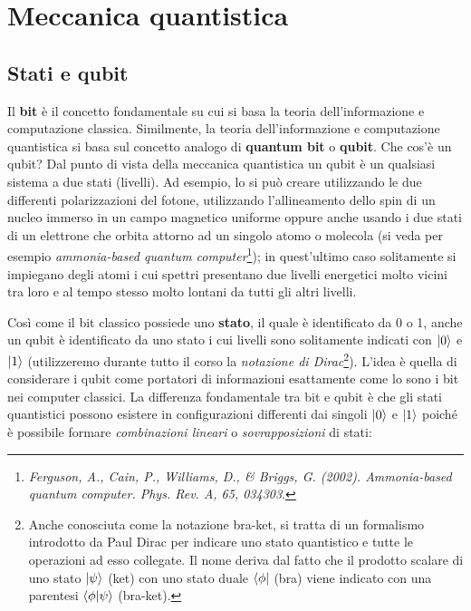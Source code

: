 \chapter{Meccanica quantistica}

\section{Stati e qubit}\label{sec:stati}

\noindent Il \textbf{bit} è il concetto fondamentale su cui si basa la teoria dell'informazione e computazione classica. Similmente, la teoria dell'informazione e computazione quantistica si basa sul concetto analogo di \textbf{quantum bit} o \textbf{qubit}. Che cos'è un qubit? Dal punto di vista della meccanica quantistica un qubit è un qualsiasi sistema a due stati (livelli). Ad esempio, lo si può creare utilizzando le due differenti polarizzazioni del fotone, utilizzando l'allineamento dello spin di un nucleo immerso in un campo magnetico uniforme oppure anche usando i due stati di un elettrone che orbita attorno ad un singolo atomo o molecola (si veda per esempio \textit{ammonia-based quantum computer}\footnote{\textit{Ferguson, A., Cain, P., Williams, D., \& Briggs, G. (2002). Ammonia-based quantum computer. Phys. Rev. A, 65, 034303}.}); in quest'ultimo caso solitamente si impiegano degli atomi i cui spettri presentano due livelli energetici molto vicini tra loro e al tempo stesso molto lontani da tutti gli altri livelli. 

\noindent Così come il bit classico possiede uno \textbf{stato}, il quale è identificato da 0 o 1, anche un qubit è identificato da uno stato i cui livelli sono solitamente indicati con $\ket{0}$ e $\ket{1}$ (utilizzeremo durante tutto il corso la \textit{notazione di Dirac}\footnote{Anche conosciuta come la notazione bra-ket, si tratta di un formalismo introdotto da Paul Dirac per indicare uno stato quantistico e tutte le operazioni ad esso collegate. Il nome deriva dal fatto che il prodotto scalare di uno stato $\ket{\psi}$ (ket) con uno stato duale $\bra{\phi}$ (bra) viene indicato con una parentesi $\braket{\phi}{\psi}$ (bra-ket).}). L'idea è quella di considerare i qubit come portatori di informazioni esattamente come lo sono i bit nei computer classici. La differenza fondamentale tra bit e qubit è che gli stati quantistici possono esistere in configurazioni differenti dai singoli $\ket{0}$ e $\ket{1}$ poiché è possibile formare \textit{combinazioni lineari} o \textit{sovrapposizioni} di stati:

